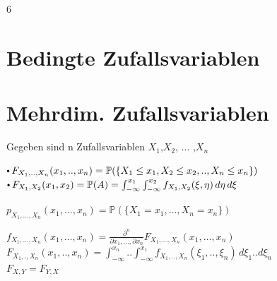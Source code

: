 \documentclass[8pt,a4paper,landscape]{extarticle}
\begin{document}
\begin{multicols*}{6}
\section{Bedingte Zufallsvariablen}
%
\CheatsheetItemListStart
\CheatsheetItemListEnd
%
\CheatsheetItemListStart
\CheatsheetItemListEnd
%
\vspace*{5pt}
%

\vspace*{4pt}

\section{Mehrdim. Zufallsvariablen}
%
Gegeben sind n Zufallsvariablen $X_1$,$X_2$, ... ,$X_n$
%
%
\par
$\sbullet F_{X_1,..,X_n}(x_1,.., x_n) = \mathbb{P}(\{X_1 \le x_1, X_2 \le x_2,.., X_n \le x_n\})$ \\
$\sbullet F_{X_1,X_2}(x_1, x_2) = \mathbb{P}(A) = \int_{-\infty}^{x_1} \int_{-\infty}^{x_2} f_{X_1,X_2}(\xi, \eta) \, d\eta \, d\xi$ \\
%
\vspace*{17pt}
\vspace*{7pt}
%
% 
  \par
  $p_{X_1, \dots, X_n}(x_1, \dots, x_n) = \mathbb{P}(\{X_1 = x_1, \dots, X_n = x_n\})$
%
%
\par
$f_{X_1,\dots,X_n}(x_1, \dots, x_n) = \frac{\partial^n}{\partial x_1, \dots, \partial x_n} F_{X_1,\dots,X_n}(x_1, \dots, x_n)$ \\[2pt]
$F_{X_1,.,X_n}(x_1,.., x_n) = \int_{-\infty}^{x_n} .. \int_{-\infty}^{x_1} f_{X_1,..,X_n}(\xi_1,.., \xi_n) \, d\xi_1 .. d\xi_n $ \\[2pt]
$F_{X,Y} = F_{Y,X}$


\end{multicols*}
\end{document}
